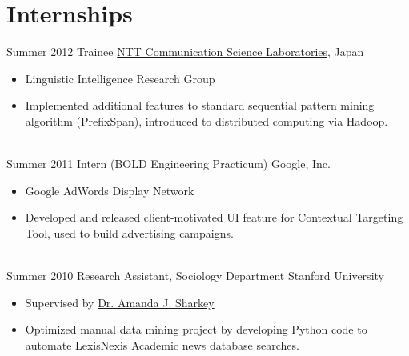 \documentclass[letterpaper]{twentysecondcv} %
\begin{document}
\section{Internships}
\begin{twenty}
	\twentyitem
    	{Summer}
        {2012}
        {Trainee}
        {\href{http://www.kecl.ntt.co.jp/rps/index.html}{NTT Communication Science Laboratories}, Japan}
        {}
        {\begin{itemize} \itemsep -2pt %
        \item Linguistic Intelligence Research Group
       	\item Implemented additional features to standard sequential pattern mining algorithm (PrefixSpan), introduced to distributed computing via Hadoop.
        \end{itemize}}
    \\
    \twentyitem
    	{Summer}
        {2011}
        {Intern (BOLD Engineering Practicum)}
        {Google, Inc.}
        {}
        {\begin{itemize}  \itemsep -2pt %
        \item Google AdWords Display Network
        \item Developed and released client-motivated UI feature for Contextual Targeting Tool,
            used to build advertising campaigns.
        \end{itemize}}
    \\
    \twentyitem
    	{Summer}
        {2010}
        {Research Assistant, Sociology Department}
        {Stanford University}
        {}
        {\begin{itemize}  \itemsep -2pt %
        \item Supervised by \href{https://www.chicagobooth.edu/faculty/directory/s/amanda-j-sharkey}{Dr. Amanda J. Sharkey}
        \item Optimized manual data mining project by developing Python code to automate
            LexisNexis Academic news database searches.
        \end{itemize} }
\end{twenty}
\end{document}
